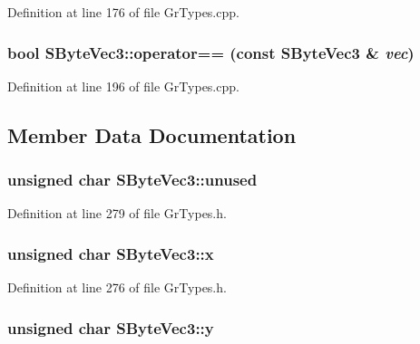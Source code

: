 Definition at line 176 of file GrTypes.cpp.\hypertarget{struct_s_byte_vec3_29592cde1e99e930b9a0ee4dc5f11661}{
\subsubsection[{operator==}]{\setlength{\rightskip}{0pt plus 5cm}bool SByteVec3::operator== (const {\bf SByteVec3} \& {\em vec})}}
\label{struct_s_byte_vec3_29592cde1e99e930b9a0ee4dc5f11661}




Definition at line 196 of file GrTypes.cpp.

\subsection{Member Data Documentation}
\hypertarget{struct_s_byte_vec3_bd50932cb0fe7b6101e12792e2bce617}{
\subsubsection[{unused}]{\setlength{\rightskip}{0pt plus 5cm}unsigned char {\bf SByteVec3::unused}}}
\label{struct_s_byte_vec3_bd50932cb0fe7b6101e12792e2bce617}




Definition at line 279 of file GrTypes.h.\hypertarget{struct_s_byte_vec3_ff06077b908dd9cabe5013c34ef711b2}{
\subsubsection[{x}]{\setlength{\rightskip}{0pt plus 5cm}unsigned char {\bf SByteVec3::x}}}
\label{struct_s_byte_vec3_ff06077b908dd9cabe5013c34ef711b2}




Definition at line 276 of file GrTypes.h.\hypertarget{struct_s_byte_vec3_0bd69fe349fb5b25a6f8db9c16a3290f}{
\subsubsection[{y}]{\setlength{\rightskip}{0pt plus 5cm}unsigned char {\bf SByteVec3::y}}}
\label{struct_s_byte_vec3_0bd69fe349fb5b25a6f8db9c16a3290f}




